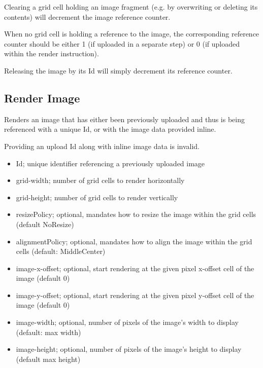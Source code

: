 \documentclass{article}
\begin{document}
Clearing a grid cell holding an image fragment (e.g. by overwriting or deleting its contents)
will decrement the image reference counter.

When no grid cell is holding a reference to the image,
the corresponding reference counter should be either 1 (if uploaded in a separate step)
or 0 (if uploaded within the render instruction).

Releasing the image by its Id will simply decrement its reference counter.

\subsection{Render Image}

Renders an image that has either been previously uploaded and thus is being referenced
with a unique Id, or with the image data provided inline.

Providing an upload Id along with inline image data is invalid.

\begin{itemize}
    \item Id; unique identifier referencing a previously uploaded image
    \item grid-width; number of grid cells to render horizontally
    \item grid-height; number of grid cells to render vertically
    \item resizePolicy; optional, mandates how to resize the image within the grid cells (default NoResize)
    \item alignmentPolicy; optional, mandates how to align the image within the grid cells (default: MiddleCenter)
    \item image-x-offset; optional, start rendering at the given pixel x-offset cell of the image (default 0)
    \item image-y-offset; optional, start rendering at the given pixel y-offset cell of the image (default 0)
    \item image-width; optional, number of pixels of the image's width to display (default: max width)
    \item image-height; optional, number of pixels of the image's height to display (default max height)
\end{itemize}
\end{document}
